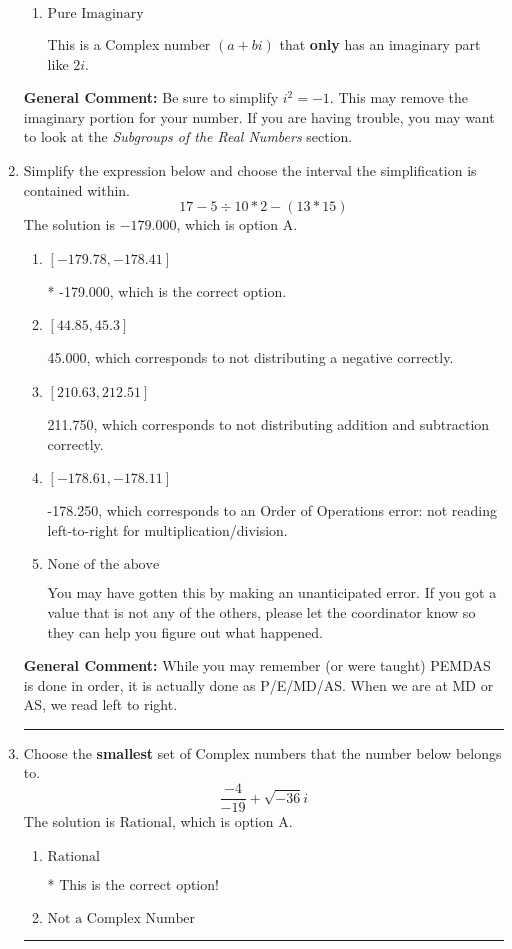 \documentclass{extbook}[14pt]
\newcommand{\litem}[1]{\item #1

\rule{\textwidth}{0.4pt}}
\begin{document}
\begin{enumerate}
{\begin{enumerate}[label=\Alph*.]
This is not a number. The only non-Complex number we know is dividing by 0 as this is not a number!
\item \( \text{Pure Imaginary} \)

This is a Complex number $(a+bi)$ that \textbf{only} has an imaginary part like $2i$.
\end{enumerate}

\textbf{General Comment:} Be sure to simplify $i^2 = -1$. This may remove the imaginary portion for your number. If you are having trouble, you may want to look at the \textit{Subgroups of the Real Numbers} section.
}
\litem{
Simplify the expression below and choose the interval the simplification is contained within.
\[ 17 - 5 \div 10 * 2 - (13 * 15) \]The solution is \( -179.000 \), which is option A.\begin{enumerate}[label=\Alph*.]
\item \( [-179.78, -178.41] \)

* -179.000, which is the correct option.
\item \( [44.85, 45.3] \)

 45.000, which corresponds to not distributing a negative correctly.
\item \( [210.63, 212.51] \)

 211.750, which corresponds to not distributing addition and subtraction correctly.
\item \( [-178.61, -178.11] \)

 -178.250, which corresponds to an Order of Operations error: not reading left-to-right for multiplication/division.
\item \( \text{None of the above} \)

 You may have gotten this by making an unanticipated error. If you got a value that is not any of the others, please let the coordinator know so they can help you figure out what happened.
\end{enumerate}

\textbf{General Comment:} While you may remember (or were taught) PEMDAS is done in order, it is actually done as P/E/MD/AS. When we are at MD or AS, we read left to right.
}
\litem{
Choose the \textbf{smallest} set of Complex numbers that the number below belongs to.
\[ \frac{-4}{-19}+\sqrt{-36}i \]The solution is \( \text{Rational} \), which is option A.\begin{enumerate}[label=\Alph*.]
\item \( \text{Rational} \)

* This is the correct option!
\item \( \text{Not a Complex Number} \)


\end{enumerate}}
\end{enumerate}
\end{document}
